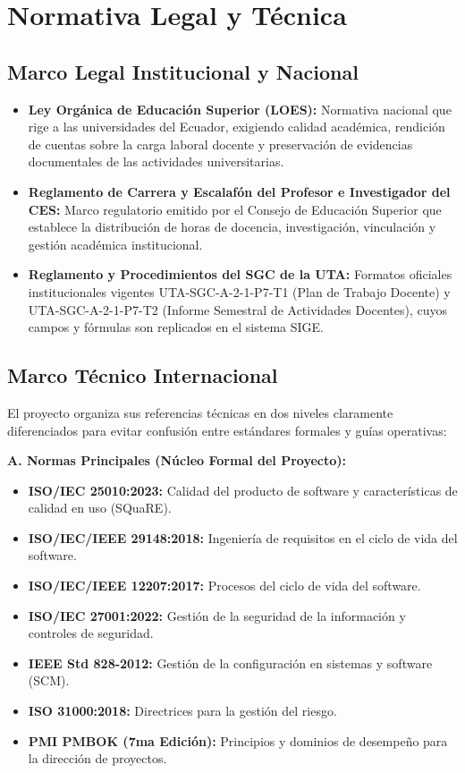 \documentclass[12pt,a4paper]{article}
\begin{document}
\section{Normativa Legal y Técnica}

\subsection{Marco Legal Institucional y Nacional}
\begin{itemize}[leftmargin=1.5em, itemsep=2pt]
    \item \textbf{Ley Orgánica de Educación Superior (LOES):} Normativa nacional que rige a las universidades del Ecuador, exigiendo calidad académica, rendición de cuentas sobre la carga laboral docente y preservación de evidencias documentales de las actividades universitarias.
    \item \textbf{Reglamento de Carrera y Escalafón del Profesor e Investigador del CES:} Marco regulatorio emitido por el Consejo de Educación Superior que establece la distribución de horas de docencia, investigación, vinculación y gestión académica institucional.
    \item \textbf{Reglamento y Procedimientos del SGC de la UTA:} Formatos oficiales institucionales vigentes UTA-SGC-A-2-1-P7-T1 (Plan de Trabajo Docente) y UTA-SGC-A-2-1-P7-T2 (Informe Semestral de Actividades Docentes), cuyos campos y fórmulas son replicados en el sistema SIGE.
\end{itemize}

\subsection{Marco Técnico Internacional}
El proyecto organiza sus referencias técnicas en dos niveles claramente diferenciados para evitar confusión entre estándares formales y guías operativas:

\textbf{A. Normas Principales (Núcleo Formal del Proyecto):}
\begin{itemize}[leftmargin=1.5em, itemsep=2pt]
    \item \textbf{ISO/IEC 25010:2023:} Calidad del producto de software y características de calidad en uso (SQuaRE).
    \item \textbf{ISO/IEC/IEEE 29148:2018:} Ingeniería de requisitos en el ciclo de vida del software.
    \item \textbf{ISO/IEC/IEEE 12207:2017:} Procesos del ciclo de vida del software.
    \item \textbf{ISO/IEC 27001:2022:} Gestión de la seguridad de la información y controles de seguridad.
    \item \textbf{IEEE Std 828-2012:} Gestión de la configuración en sistemas y software (SCM).
    \item \textbf{ISO 31000:2018:} Directrices para la gestión del riesgo.
    \item \textbf{PMI PMBOK (7ma Edición):} Principios y dominios de desempeño para la dirección de proyectos.
\end{itemize}
\end{document}
